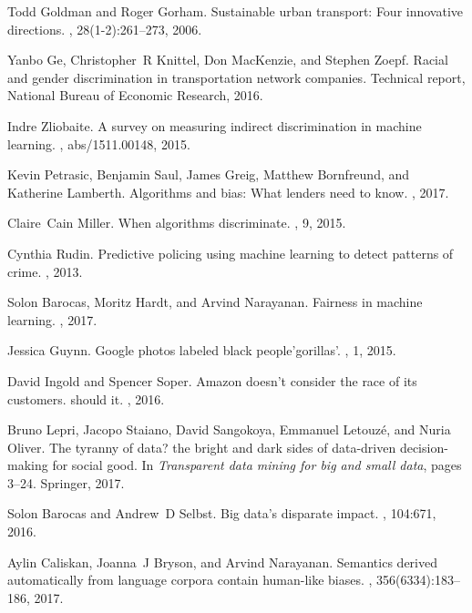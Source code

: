 Todd Goldman and Roger Gorham.
\newblock Sustainable urban transport: Four innovative directions.
, 28(1-2):261--273, 2006.

Yanbo Ge, Christopher~R Knittel, Don MacKenzie, and Stephen Zoepf.
\newblock Racial and gender discrimination in transportation network companies.
\newblock Technical report, National Bureau of Economic Research, 2016.

Indre Zliobaite.
\newblock A survey on measuring indirect discrimination in machine learning.
, abs/1511.00148, 2015.

Kevin Petrasic, Benjamin Saul, James Greig, Matthew Bornfreund, and Katherine
  Lamberth.
\newblock Algorithms and bias: What lenders need to know.
, 2017.

Claire~Cain Miller.
\newblock When algorithms discriminate.
, 9, 2015.

Cynthia Rudin.
\newblock Predictive policing using machine learning to detect patterns of
  crime.
, 2013.

Solon Barocas, Moritz Hardt, and Arvind Narayanan.
\newblock Fairness in machine learning.
, 2017.

Jessica Guynn.
\newblock Google photos labeled black people’gorillas’.
, 1, 2015.

David Ingold and Spencer Soper.
\newblock Amazon doesn’t consider the race of its customers. should it.
, 2016.

Bruno Lepri, Jacopo Staiano, David Sangokoya, Emmanuel Letouz{\'e}, and Nuria
  Oliver.
\newblock The tyranny of data? the bright and dark sides of data-driven
  decision-making for social good.
\newblock In {\em Transparent data mining for big and small data}, pages 3--24.
  Springer, 2017.

Solon Barocas and Andrew~D Selbst.
\newblock Big data's disparate impact.
, 104:671, 2016.

Aylin Caliskan, Joanna~J Bryson, and Arvind Narayanan.
\newblock Semantics derived automatically from language corpora contain
  human-like biases.
, 356(6334):183--186, 2017.

